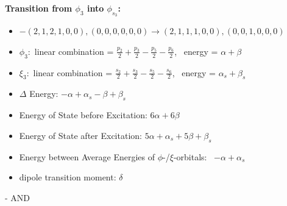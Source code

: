 \documentclass[12pt,a4paper]{article}
\begin{document}
        \noindent\textbf{Transition from $\phi_{3}$ into $\phi_{s_{3}}$:}
        \begin{itemize}
            \item $- (2, 1, 2, 1, 0, 0), (0, 0, 0, 0, 0, 0) \rightarrow (2, 1, 1, 1, 0, 0), (0, 0, 1, 0, 0, 0)$
        
            \item $\phi_{3}:$ linear combination = $\frac{p_{2}}{2} + \frac{p_{3}}{2} - \frac{p_{5}}{2} - \frac{p_{6}}{2}$, \
            energy = $\alpha + \beta$
            
            \item $\xi_{3}:$ linear combination = $\frac{s_{2}}{2} + \frac{s_{3}}{2} - \frac{s_{5}}{2} - \frac{s_{6}}{2}$, \
            energy = $\alpha_{s} + \beta_{s}$
            
            \item $\Delta$ Energy: $- \alpha + \alpha_{s} - \beta + \beta_{s}$
            \item Energy of State before Excitation: $6 \alpha + 6 \beta$
            \item Energy of State after Excitation: $5 \alpha + \alpha_{s} + 5 \beta + \beta_{s}$
            \item Energy between Average Energies of $\phi$-/$\xi$-orbitals: \
            $- \alpha + \alpha_{s}$
        
            \item dipole transition moment: $\delta$
        
        \end{itemize}
        
 -  AND 
\end{document}
